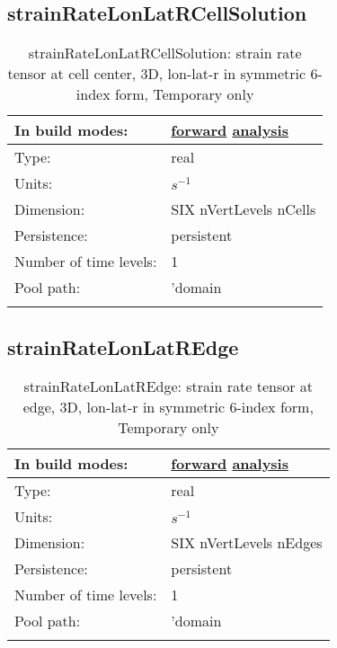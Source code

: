 \subsection[strainRateLonLatRCellSolution]{strainRateLonLatRCellSolution}
\label{subsec:var_sec_scratch_strainRateLonLatRCellSolution}
\begin{center}
\begin{longtable}{| p{2.0in} | p{4.0in} |}
        \hline 
        In build modes: & \hyperref[subsec:forward_var_tab_scratch]{forward} \hyperref[subsec:analysis_var_tab_scratch]{analysis} \\
        \hline 
        Type: & real \\
        \hline 
        Units: & $s^{-1}$ \\
        \hline 
        Dimension: & SIX nVertLevels nCells \\
        \hline 
        Persistence: & persistent \\
        \hline 
        Number of time levels: & 1 \\
        \hline 
            Pool path: & 'domain %
 \\
		 \hline 
    \caption{strainRateLonLatRCellSolution: strain rate tensor at cell center, 3D, lon-lat-r in symmetric 6-index form, {\color{red}Temporary only}}
\end{longtable}
\end{center}
\subsection[strainRateLonLatREdge]{strainRateLonLatREdge}
\label{subsec:var_sec_scratch_strainRateLonLatREdge}
\begin{center}
\begin{longtable}{| p{2.0in} | p{4.0in} |}
        \hline 
        In build modes: & \hyperref[subsec:forward_var_tab_scratch]{forward} \hyperref[subsec:analysis_var_tab_scratch]{analysis} \\
        \hline 
        Type: & real \\
        \hline 
        Units: & $s^{-1}$ \\
        \hline 
        Dimension: & SIX nVertLevels nEdges \\
        \hline 
        Persistence: & persistent \\
        \hline 
        Number of time levels: & 1 \\
        \hline 
            Pool path: & 'domain %
 \\
		 \hline 
    \caption{strainRateLonLatREdge: strain rate tensor at edge, 3D, lon-lat-r in symmetric 6-index form, {\color{red}Temporary only}}
\end{longtable}
\end{center}
